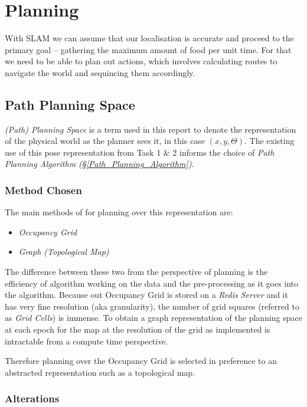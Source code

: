 \documentclass[11pt, a4paper]{article}
\begin{document}
\newpage
\section{Planning}

With SLAM we can assume that our localisation is accurate and proceed to the primary goal -- gathering 
the maximum amount of food per unit time. For that we need to be able to plan out actions, which involves 
calculating routes to navigate the world and sequincing them accordingly.

\subsection{Path Planning Space}
\label{Path_Planning_Space}

\textit{(Path) Planning Space} is a term used  in this report to denote the representation of the 
physical world as the planner sees it, in this case $(x, y, \Theta)$. The existing use of this
pose representation from Task 1 \& 2 informs the choice of \textit{Path Planning Algorithm 
(\S\ref{Path_Planning_Algorithm})}. 

\subsubsection{Method Chosen}

The main methods of for planning over this representation are: \cite{path_space}

\begin{itemize}
	\item \textit{Occupancy Grid}
	\item \textit{Graph (Topological Map)}
\end{itemize}


The difference between these two from the perspective of planning is the efficiency of algorithm working 
on the data and the pre-processing as it goes into the algorithm. Because out Occupancy Grid is stored 
on a \textit{Redis Server} and it has very fine resolution (aka granularity), the number of grid 
squares (referred to as \textit{Grid Cells}) is immense. To obtain a graph representation of the
planning space at each epoch for the map at the resolution of the grid as implemented is
intractable from a compute time perspective.

Therefore planning over the Occupancy Grid is selected in preference to an abstracted representation
such as a topological map.

\subsubsection{Alterations}
\end{document}
